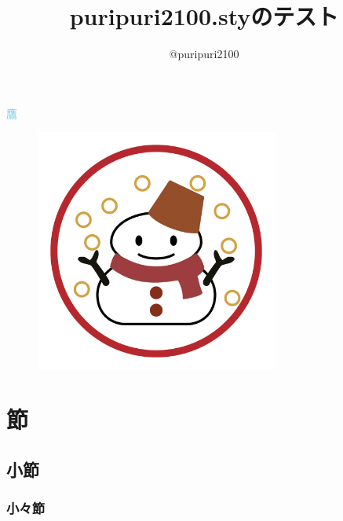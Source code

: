 \documentclass[titlepage]{ltjsarticle}
\begin{document}
\title{\textsf{puripuri2100.sty}のテスト}
\nonsubtitle
\author{@puripuri2100}
\nondate
\date{\puritoday}
\purimaketitle



\tableofcontents

\textcolor{SkyBlue}{鷹}
\begin{figure}[h]
\centering
\includegraphics[width=80mm]{aki.jpg}
\end{figure}


\section{節}
\subsection{小節}
\subsubsection{小々節}
\end{document}
